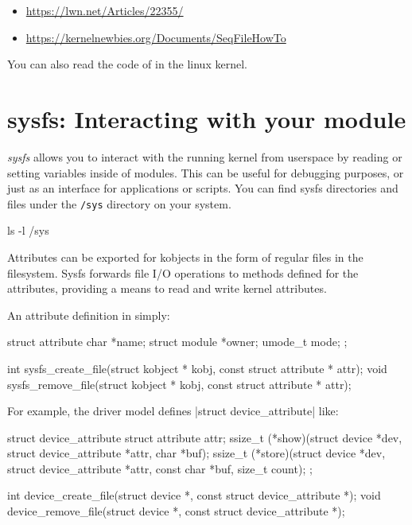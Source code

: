 \documentclass[10pt, oneside]{book}
\begin{document}
\begin{itemize}
  \item \url{https://lwn.net/Articles/22355/}
  \item \url{https://kernelnewbies.org/Documents/SeqFileHowTo}
\end{itemize}

You can also read the code of  in the linux kernel.

\section{sysfs: Interacting with your module}
\label{sec:sysfs}
\emph{sysfs} allows you to interact with the running kernel from userspace by reading or setting variables inside of modules.
This can be useful for debugging purposes, or just as an interface for applications or scripts.
You can find sysfs directories and files under the \verb|/sys| directory on your system.

\begin{codebash}
ls -l /sys
\end{codebash}

Attributes can be exported for kobjects in the form of regular files in the filesystem.
Sysfs forwards file I/O operations to methods defined for the attributes, providing a means to read and write kernel attributes.

An attribute definition in simply:

\begin{code}
struct attribute {
    char *name;
    struct module *owner;
    umode_t mode;
};

int sysfs_create_file(struct kobject * kobj, const struct attribute * attr);
void sysfs_remove_file(struct kobject * kobj, const struct attribute * attr);
\end{code}

For example, the driver model defines \cpp|struct device_attribute| like:

\begin{code}
struct device_attribute {
    struct attribute attr;
    ssize_t (*show)(struct device *dev, struct device_attribute *attr,
                    char *buf);
    ssize_t (*store)(struct device *dev, struct device_attribute *attr,
                    const char *buf, size_t count);
};

int device_create_file(struct device *, const struct device_attribute *);
void device_remove_file(struct device *, const struct device_attribute *);
\end{code}
\end{document}
